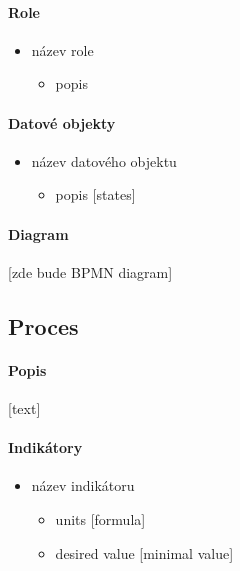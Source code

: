 \documentclass[11pt,a4paper]{article}
\begin{document}
\paragraph{Role}

\begin{itemize}
    \item název role
    \begin{itemize}
        \item popis
    \end{itemize}
\end{itemize}

\paragraph{Datové objekty}

\begin{itemize}
    \item název datového objektu
    \begin{itemize}
        \item popis [states]
    \end{itemize}
\end{itemize}

\paragraph{Diagram}

[zde bude BPMN diagram]

\subsection{Proces }

\paragraph{Popis}

[text]

\paragraph{Indikátory}

\begin{itemize}
    \item název indikátoru
    \begin{itemize}
        \item units [formula]
        \item desired value [minimal value]
    \end{itemize}
\end{itemize}
\end{document}
